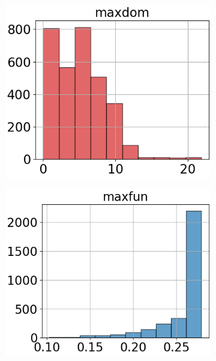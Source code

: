 \begin{figure}[htbp]
    \begin{subfigure}[t]{.24\textwidth}
        \centering 
        \includegraphics[width=\linewidth]{../../python_code/plots/logistic_regression/histogram-maxdom.png}
    \end{subfigure}
    \begin{subfigure}[t]{.24\textwidth}
        \centering 
        \includegraphics[width=\linewidth]{../../python_code/plots/logistic_regression/histogram-maxfun.png}
    \end{subfigure}
    \begin{subfigure}[t]{.24\textwidth}

\end{subfigure}
\end{figure}
